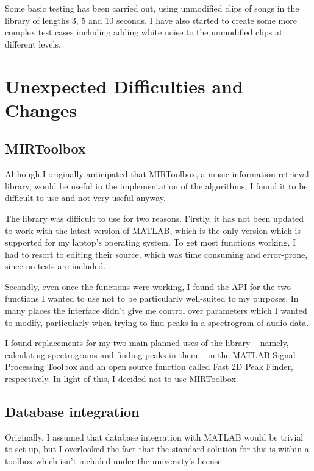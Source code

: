 \documentclass[12pt]{article}
\begin{document}
Some basic testing has been carried out, using unmodified clips of songs in the library of lengths 3, 5 and 10 seconds. I have also started to create some more complex test cases including adding white noise to the unmodified clips at different levels.

\section*{Unexpected Difficulties and Changes}

\subsection*{MIRToolbox}

Although I originally anticipated that MIRToolbox, a music information retrieval library, would be useful in the implementation of the algorithms, I found it to be difficult to use and not very useful anyway. 

The library was difficult to use for two reasons. Firstly, it has not been updated to work with the latest version of MATLAB, which is the only version which is supported for my laptop's operating system. To get most functions working, I had to resort to editing their source, which was time consuming and error-prone, since no tests are included.

Secondly, even once the functions were working, I found the API for the two functions I wanted to use not to be particularly well-suited to my purposes. In many places the interface didn't give me control over parameters which I wanted to modify, particularly when trying to find peaks in a spectrogram of audio data.

I found replacements for my two main planned uses of the library -- namely, calculating spectrograms and finding peaks in them -- in the MATLAB Signal Processing Toolbox and an open source function called Fast 2D Peak Finder, respectively. In light of this, I decided not to use MIRToolbox.

\subsection*{Database integration}

Originally, I assumed that database integration with MATLAB would be trivial to set up, but I overlooked the fact that the standard solution for this is within a toolbox which isn't included under the university's license. 
\end{document}
